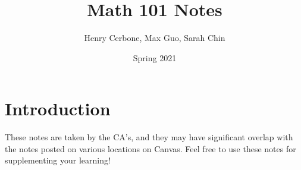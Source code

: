 \documentclass{article}
\title{Math 101 Notes}
\author{Henry Cerbone, Max Guo, Sarah Chin}
\date{Spring 2021}
\begin{document}
\maketitle

\tableofcontents

\section{Introduction}

These notes are taken by the CA's, and they may have significant overlap with the notes posted on various locations on Canvas. Feel free to use these notes for supplementing your learning!

























\end{document}
